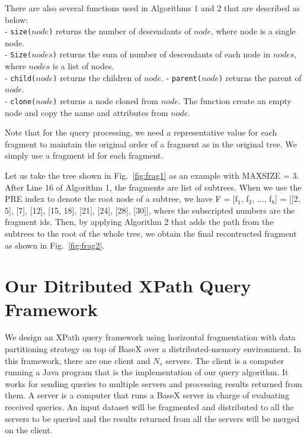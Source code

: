 There are also several functions used in Algorithms 1 and 2 that are described 
as below:\\
- \texttt{size($node$)} returns the number of descendants of $node$, where node
is a single node.\\
- \texttt{Size($nodes$)} returns the sum of number of descendants of each node
in $nodes$, where $nodes$ is a list of nodes.\\
- \texttt{child($node$)} returns the children of $node$.
- \texttt{parent($node$)} returns the parent of $node$.\\
- \texttt{clone($node$)} returns a node cloned from $node$. The function create
an empty node and copy the name and attributes from $node$.

Note that for the query processing, we need a representative value for each
fragment to maintain the original order of a fragment as in the original tree.
We simply use a fragment id for each fragment.

Let us take the tree shown in Fig.~\ref{fig:frag1} as an example with MAXSIZE =
3. After Line 16 of Algorithm 1, the fragments are list of subtrees. When we use
the PRE index to denote the root node of a subtree, we have F = [f$_1$, f$_2$, ...,
f$_8$] = [[2, 5], [7], [12], [15, 18], [21], [24], [28], [30]], where the
subscripted numbers are the fragment ids. Then, by applying Algorithm 2 that adds
the path from the subtrees to the root of the whole tree, we obtain the final
recontructed fragment as shown in Fig.~\ref{fig:frag2}.

\section{Our Ditributed XPath Query Framework}

We design an XPath query framework using horizontal fragmentation with data
partitioning strategy on top of BaseX over a distributed-memory environment. 
In this framework, there are one client and $N_s$ servers. The client is a
computer running a Java program that is the implementation of our query
algorithm. It works for sending queries to multiple servers and processing
results returned from them. A server is a computer that runs a BaseX server in
charge of evaluating received queries. An input dataset will be fragmented and
distributed to all the servers to be queried and the results returned from all
the servers will be merged on the client.

